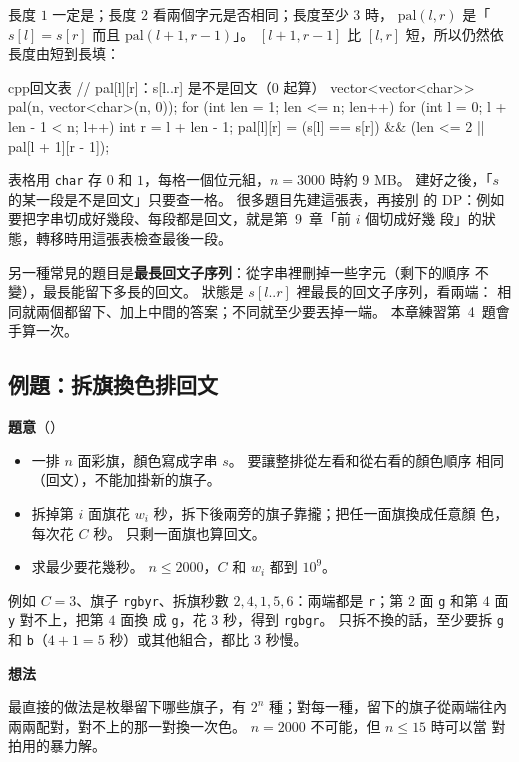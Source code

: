 長度 $1$ 一定是；長度 $2$ 看兩個字元是否相同；長度至少 $3$ 時，
$\mathrm{pal}(l, r)$ 是「$s[l] = s[r]$ 而且 $\mathrm{pal}(l + 1, r - 1)$」。
$[l + 1, r - 1]$ 比 $[l, r]$ 短，所以仍然依長度由短到長填：

\begin{code}{cpp}{回文表}
// pal[l][r]：s[l..r] 是不是回文（0 起算）
vector<vector<char>> pal(n, vector<char>(n, 0));
for (int len = 1; len <= n; len++) {
    for (int l = 0; l + len - 1 < n; l++) {
        int r = l + len - 1;
        pal[l][r] = (s[l] == s[r]) && (len <= 2 || pal[l + 1][r - 1]);
    }
}
\end{code}

表格用 \texttt{char} 存 $0$ 和 $1$，每格一個位元組，$n = 3000$ 時約 $9$ MB。
建好之後，「$s$ 的某一段是不是回文」只要查一格。 很多題目先建這張表，再接別
的 DP：例如要把字串切成好幾段、每段都是回文，就是第~9~章「前 $i$ 個切成好幾
段」的狀態，轉移時用這張表檢查最後一段。

另一種常見的題目是\textbf{最長回文子序列}：從字串裡刪掉一些字元（剩下的順序
不變），最長能留下多長的回文。 狀態是 $s[l..r]$ 裡最長的回文子序列，看兩端：
相同就兩個都留下、加上中間的答案；不同就至少要丟掉一端。 本章練習第~4~題會
手算一次。

\subsection{例題：拆旗換色排回文}
\label{sec:ex-ivdp-flags}

\textbf{題意}（）

\begin{itemize}
\item 一排 $n$ 面彩旗，顏色寫成字串 $s$。 要讓整排從左看和從右看的顏色順序
相同（回文），不能加掛新的旗子。
\item 拆掉第 $i$ 面旗花 $w_i$ 秒，拆下後兩旁的旗子靠攏；把任一面旗換成任意顏
色，每次花 $C$ 秒。 只剩一面旗也算回文。
\item 求最少要花幾秒。 $n \le 2000$，$C$ 和 $w_i$ 都到 $10^9$。
\end{itemize}

例如 $C = 3$、旗子 \texttt{rgbyr}、拆旗秒數 $2, 4, 1, 5, 6$：兩端都是
\texttt{r}；第 $2$ 面 \texttt{g} 和第 $4$ 面 \texttt{y} 對不上，把第 $4$ 面換
成 \texttt{g}，花 $3$ 秒，得到 \texttt{rgbgr}。 只拆不換的話，至少要拆
\texttt{g} 和 \texttt{b}（$4 + 1 = 5$ 秒）或其他組合，都比 $3$ 秒慢。

\textbf{想法}

最直接的做法是枚舉留下哪些旗子，有 $2^n$ 種；對每一種，留下的旗子從兩端往內
兩兩配對，對不上的那一對換一次色。 $n = 2000$ 不可能，但 $n \le 15$ 時可以當
對拍用的暴力解。

